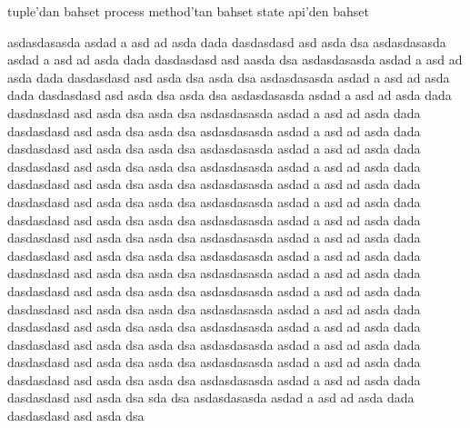 tuple'dan bahset
process method'tan bahset
state api'den bahset

asdasdasasda asdad a asd ad asda dada dasdasdasd asd asda dsa asdasdasasda asdad a asd ad asda dada dasdasdasd asd aasda dsa asdasdasasda asdad a asd ad asda dada dasdasdasd asd asda dsa asda dsa asdasdasasda asdad a asd ad asda dada dasdasdasd asd asda dsa asda dsa asdasdasasda asdad a asd ad asda dada dasdasdasd asd asda dsa asda dsa asdasdasasda asdad a asd ad asda dada dasdasdasd asd asda dsa asda dsa asdasdasasda asdad a asd ad asda dada dasdasdasd asd asda dsa asda dsa asdasdasasda asdad a asd ad asda dada dasdasdasd asd asda dsa asda dsa asdasdasasda asdad a asd ad asda dada dasdasdasd asd asda dsa asda dsa asdasdasasda asdad a asd ad asda dada dasdasdasd asd asda dsa asda dsa asdasdasasda asdad a asd ad asda dada dasdasdasd asd asda dsa asda dsa asdasdasasda asdad a asd ad asda dada dasdasdasd asd asda dsa asda dsa asdasdasasda asdad a asd ad asda dada dasdasdasd asd asda dsa asda dsa asdasdasasda asdad a asd ad asda dada dasdasdasd asd asda dsa asda dsa asdasdasasda asdad a asd ad asda dada dasdasdasd asd asda dsa asda dsa asdasdasasda asdad a asd ad asda dada dasdasdasd asd asda dsa asda dsa asdasdasasda asdad a asd ad asda dada dasdasdasd asd asda dsa asda dsa asdasdasasda asdad a asd ad asda dada dasdasdasd asd asda dsa asda dsa asdasdasasda asdad a asd ad asda dada dasdasdasd asd asda dsa asda dsa asdasdasasda asdad a asd ad asda dada dasdasdasd asd asda dsa asda dsa asdasdasasda asdad a asd ad asda dada dasdasdasd asd asda dsa sda dsa asdasdasasda asdad a asd ad asda dada dasdasdasd asd asda dsa 

